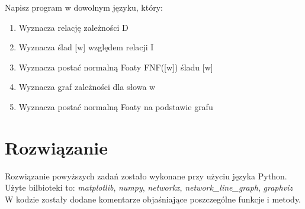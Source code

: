 \documentclass[12pt]{article}
\begin{document}
Napisz program w dowolnym języku, który:
\begin{enumerate}
    \item Wyznacza relację zależności D
    \item Wyznacza ślad [w] względem relacji I
    \item Wyznacza postać normalną Foaty FNF([w]) śladu [w]
    \item Wyznacza graf zależności dla słowa w
    \item Wyznacza postać normalną Foaty na podstawie grafu
\end{enumerate}

\section{Rozwiązanie}
Rozwiązanie powyższych zadań zostało wykonane przy użyciu języka Python. Użyte bilbioteki to: \emph{matplotlib}, \emph{numpy}, \emph{networkx}, \emph{network\_line\_graph}, \emph{graphviz}
W kodzie zostały dodane komentarze objaśniające poszczególne funkcje i metody.
\end{document}

